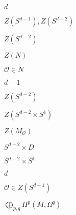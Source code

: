 \begin{preview}
\setcounter{equation}{0}%
\( d \)
\end{preview}

\begin{preview}
\setcounter{equation}{0}%
\( Z(S^{d-1}), Z(S^{d-2}) \)
\end{preview}

\begin{preview}
\setcounter{equation}{0}%
\( Z(S^{d-2}) \)
\end{preview}

\begin{preview}
\setcounter{equation}{0}%
\( Z(N) \)
\end{preview}

\begin{preview}
\setcounter{equation}{0}%
\( \mathcal{O} \in N \)
\end{preview}

\begin{preview}
\setcounter{equation}{0}%
\( d-1 \)
\end{preview}

\begin{preview}
\setcounter{equation}{0}%
\( Z(S^{d-2}) \)
\end{preview}

\begin{preview}
\setcounter{equation}{0}%
\( Z(S^{d-2} \times  S^1) \)
\end{preview}

\begin{preview}
\setcounter{equation}{0}%
\( Z(M_{\mathcal{O}}) \)
\end{preview}

\begin{preview}
\setcounter{equation}{0}%
\( S^{d-2} \times D \)
\end{preview}

\begin{preview}
\setcounter{equation}{0}%
\( S^{d-2} \times S^1 \)
\end{preview}

\begin{preview}
\setcounter{equation}{0}%
\( d \)
\end{preview}

\begin{preview}
\setcounter{equation}{0}%
\( \mathcal{O} \in Z(S^{d-1}) \)
\end{preview}

\begin{preview}
\setcounter{equation}{0}%
\( \bigoplus_{p,q}^{} H^p(M , \Omega ^q) \)
\end{preview}


